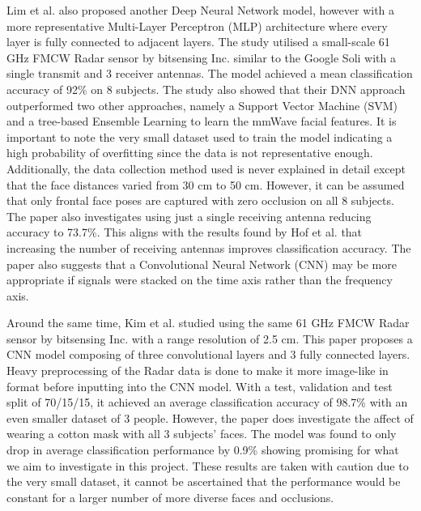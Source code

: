 \documentclass{interim}
\begin{document}
Lim et al. \cite{lim2020dnn} also proposed another Deep Neural Network model, however with a more representative Multi-Layer Perceptron (MLP) architecture where every layer is fully connected to adjacent layers. The study utilised a small-scale 61 GHz FMCW Radar sensor by bitsensing Inc. similar to the Google Soli with a single transmit and 3 receiver antennas. The model achieved a mean classification accuracy of 92\% on 8 subjects. The study also showed that their DNN approach outperformed two other approaches, namely a Support Vector Machine (SVM) and a tree-based Ensemble Learning to learn the mmWave facial features. It is important to note the very small dataset used to train the model indicating a high probability of overfitting since the data is not representative enough. Additionally, the data collection method used is never explained in detail except that the face distances varied from 30 cm to 50 cm. However, it can be assumed that only frontal face poses are captured with zero occlusion on all 8 subjects. The paper also investigates using just a single receiving antenna reducing accuracy to 73.7\%. This aligns with the results found by Hof et al. \cite{hof2020face} that increasing the number of receiving antennas improves classification accuracy. The paper also suggests that a Convolutional Neural Network (CNN) may be more appropriate if signals were stacked on the time axis rather than the frequency axis.

Around the same time, Kim et al. \cite{kim2020face} studied using the same 61 GHz FMCW Radar sensor by bitsensing Inc. with a range resolution of 2.5 cm. This paper proposes a CNN model composing of three convolutional layers and 3 fully connected layers. Heavy preprocessing of the Radar data is done to make it more image-like in format before inputting into the CNN model. With a test, validation and test split of 70/15/15, it achieved an average classification accuracy of 98.7\% with an even smaller dataset of 3 people. However, the paper does investigate the affect of wearing a cotton mask with all 3 subjects' faces. The model was found to only drop in average classification performance by 0.9\% showing promising for what we aim to investigate in this project. These results are taken with caution due to the very small dataset, it cannot be ascertained that the performance would be constant for a larger number of more diverse faces and occlusions.
\end{document}
